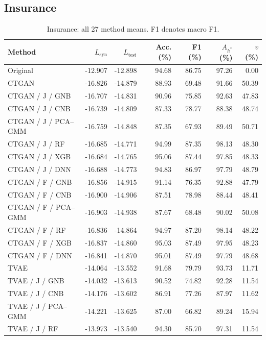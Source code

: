 \documentclass[11pt,letterpaper]{article}
\newcommand{\Lsyn}{L_{\mathrm{syn}}}
\newcommand{\Ltest}{L_{\mathrm{test}}}
\begin{document}
\subsection{Insurance}
\begin{table}[H]\centering
\caption{Insurance: all 27 method means. F1 denotes macro F1.}\label{tab:all-insurance}
\small
\begin{tabular}{lrrrrrr}\toprule
Method & $\Lsyn$ & $\Ltest$ & Acc. (\%) & F1 (\%) & $A_{h^*}$ (\%) & $v$ (\%)\\\midrule
Original & -12.907 & -12.898 & 94.68 & 86.75 & 97.26 & 0.00\\
CTGAN & -16.826 & -14.879 & 88.93 & 69.48 & 91.66 & 50.39\\
CTGAN / J / GNB & -16.707 & -14.831 & 90.96 & 75.85 & 92.63 & 47.83\\
CTGAN / J / CNB & -16.739 & -14.809 & 87.33 & 78.77 & 88.38 & 48.74\\
CTGAN / J / PCA--GMM & -16.759 & -14.848 & 87.35 & 67.93 & 89.49 & 50.71\\
CTGAN / J / RF & -16.685 & -14.771 & 94.99 & 87.35 & 98.13 & 48.30\\
CTGAN / J / XGB & -16.684 & -14.765 & 95.06 & 87.44 & 97.85 & 48.33\\
CTGAN / J / DNN & -16.688 & -14.773 & 94.83 & 86.97 & 97.79 & 48.79\\
CTGAN / F / GNB & -16.856 & -14.915 & 91.14 & 76.35 & 92.88 & 47.79\\
CTGAN / F / CNB & -16.900 & -14.906 & 87.51 & 78.98 & 88.44 & 48.41\\
CTGAN / F / PCA--GMM & -16.903 & -14.938 & 87.67 & 68.48 & 90.02 & 50.08\\
CTGAN / F / RF & -16.836 & -14.864 & 94.97 & 87.20 & 98.14 & 48.22\\
CTGAN / F / XGB & -16.837 & -14.860 & 95.03 & 87.49 & 97.95 & 48.23\\
CTGAN / F / DNN & -16.841 & -14.870 & 95.01 & 87.49 & 97.79 & 48.68\\
TVAE & -14.064 & -13.552 & 91.68 & 79.79 & 93.73 & 11.71\\
TVAE / J / GNB & -14.032 & -13.613 & 90.52 & 74.82 & 92.28 & 11.54\\
TVAE / J / CNB & -14.176 & -13.602 & 86.91 & 77.26 & 87.97 & 11.62\\
TVAE / J / PCA--GMM & -14.221 & -13.625 & 87.00 & 66.82 & 89.24 & 15.94\\
TVAE / J / RF & -13.973 & -13.540 & 94.30 & 85.70 & 97.31 & 11.54\\

\end{tabular}
\end{table}
\end{document}

